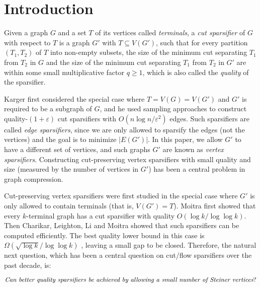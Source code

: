 \section{Introduction}

Given a graph $G$ and a set $T$ of its vertices called \emph{terminals}, a \emph{cut sparsifier} of $G$ with respect to $T$ is a graph $G'$ with $T\subseteq V(G')$, such that for every partition $(T_1,T_2)$ of $T$ into non-empty subsets, the size of the minimum cut separating $T_1$ from $T_2$ in $G$ and the size of the minimum cut separating $T_1$ from $T_2$ in $G'$ are within some small multiplicative factor $q\ge 1$, which is also called the \emph{quality} of the sparsifier.


Karger \cite{karger1993global,karger1999random} first considered the special case where $T=V(G)=V(G')$ and $G'$ is required to be a subgraph of $G$, and
he used sampling approaches to construct quality-$(1+\varepsilon)$ cut sparsifiers with $O(n\log n/\varepsilon^2)$ edges.
Such sparsifiers are called \emph{edge sparsifiers}, since we are only allowed to sparsify the edges (not the vertices) and the goal is to minimize $|E(G')|$.
In this paper, we allow $G'$ to have a different set of vertices, and such graphs $G'$ are known as \emph{vertex sparsifiers}.
Constructing cut-preserving vertex sparsifiers with small quality and size (measured by the number of vertices in $G'$) has been a central problem in graph compression.

Cut-preserving vertex sparsifiers were first studied in the special case where $G'$ is only allowed to contain terminals (that is, $V(G')=T$). Moitra \cite{moitra2009approximation} first showed that every  $k$-terminal graph has a cut sparsifier with quality $O(\log k/\log\log k)$.
Then Charikar, Leighton, Li and Moitra \cite{charikar2010vertex} showed that such sparsifiers can be computed efficiently.
The best quality lower bound in this case is $\Omega(\sqrt{\log k}/\log\log k)$ \cite{makarychev2010metric,charikar2010vertex}, leaving a small gap to be closed. 
%
Therefore, the natural next question, which has been a central question on cut/flow sparsifiers over the past decade, is:

\vspace{-10pt}
\[\emph{Can better quality sparsifiers be achieved by allowing a small number of Steiner vertices}? 
\]
\vspace{-10pt}


